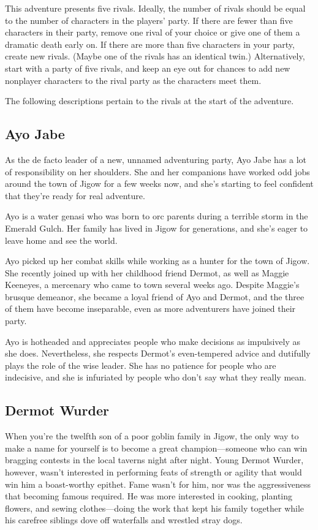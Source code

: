 \documentclass[10pt,a4paper,twoside,bg=print,twocolumn,openany,nodeprecatedcode]{dndbook}
\begin{document}
This adventure presents five rivals. Ideally, the number of rivals should be equal to the number of characters in the players' party. If there are fewer than five characters in their party, remove one rival of your choice or give one of them a dramatic death early on. If there are more than five characters in your party, create new rivals. (Maybe one of the rivals has an identical twin.) Alternatively, start with a party of five rivals, and keep an eye out for chances to add new nonplayer characters to the rival party as the characters meet them.

The following descriptions pertain to the rivals at the start of the adventure.

\subsection{Ayo Jabe}
As the de facto leader of a new, unnamed adventuring party, Ayo Jabe has a lot of responsibility on her shoulders. She and her companions have worked odd jobs around the town of Jigow for a few weeks now, and she's starting to feel confident that they're ready for real adventure.

Ayo is a water genasi who was born to orc parents during a terrible storm in the Emerald Gulch. Her family has lived in Jigow for generations, and she's eager to leave home and see the world.

Ayo picked up her combat skills while working as a hunter for the town of Jigow. She recently joined up with her childhood friend Dermot, as well as Maggie Keeneyes, a mercenary who came to town several weeks ago. Despite Maggie's brusque demeanor, she became a loyal friend of Ayo and Dermot, and the three of them have become inseparable, even as more adventurers have joined their party.

Ayo is hotheaded and appreciates people who make decisions as impulsively as she does. Nevertheless, she respects Dermot's even-tempered advice and dutifully plays the role of the wise leader. She has no patience for people who are indecisive, and she is infuriated by people who don't say what they really mean.

\subsection{Dermot Wurder}
When you're the twelfth son of a poor goblin family in Jigow, the only way to make a name for yourself is to become a great champion—someone who can win bragging contests in the local taverns night after night. Young Dermot Wurder, however, wasn't interested in performing feats of strength or agility that would win him a boast-worthy epithet. Fame wasn't for him, nor was the aggressiveness that becoming famous required. He was more interested in cooking, planting flowers, and sewing clothes—doing the work that kept his family together while his carefree siblings dove off waterfalls and wrestled stray dogs.
\end{document}
